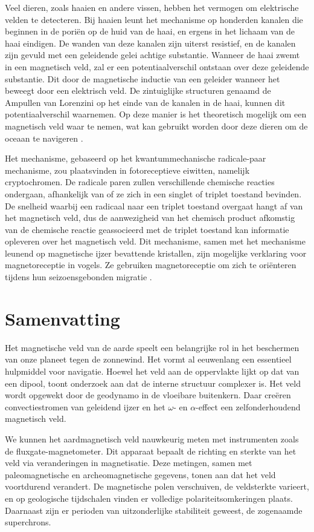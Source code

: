 \documentclass[12pt,a4paper]{article}
\begin{document}
Veel dieren, zoals haaien en andere vissen, hebben het vermogen om elektrische velden te detecteren.
Bij haaien leunt het mechanisme op honderden kanalen die beginnen in de poriën op de huid van de haai, en ergens in het lichaam van de haai eindigen.
De wanden van deze kanalen zijn uiterst resistief, en de kanalen zijn gevuld met een geleidende gelei achtige substantie. Wanneer de haai zwemt in een magnetisch veld, zal er een potentiaalverschil ontstaan over deze geleidende substantie.
Dit door de magnetische inductie van een geleider wanneer het beweegt door een elektrisch veld. De zintuiglijke structuren genaamd de Ampullen van Lorenzini op het einde van de kanalen in de haai, kunnen dit potentiaalverschil waarnemen.
Op deze manier is het theoretisch mogelijk om een magnetisch veld waar te nemen, wat kan gebruikt worden door deze dieren om de oceaan te navigeren
\cite{ijmert_physics_today}. 

Het mechanisme, gebaseerd op het kwantummechanische radicale-paar mechanisme, zou plaatsvinden in fotoreceptieve eiwitten, namelijk cryptochromen.
De radicale paren zullen verschillende chemische reacties ondergaan, afhankelijk van of ze zich in een singlet of triplet toestand bevinden.
De snelheid waarbij een radicaal naar een triplet toestand overgaat hangt af van het magnetisch veld, dus de aanwezigheid van het chemisch product afkomstig van de chemische reactie geassocieerd met de triplet toestand kan informatie opleveren over het magnetisch veld.
Dit mechanisme, samen met het mechanisme leunend op magnetische ijzer bevattende kristallen, zijn mogelijke verklaring voor magnetoreceptie in vogels.
Ze gebruiken magnetoreceptie om zich te oriënteren tijdens hun seizoensgebonden migratie 
\cite{ijmert_physics_today, ijmert_royal_society}.
\section{Samenvatting}

Het magnetische veld van de aarde speelt een belangrijke rol in het beschermen van onze planeet tegen de zonnewind. Het vormt al eeuwenlang een essentieel hulpmiddel voor navigatie. Hoewel het veld aan de oppervlakte lijkt op dat van een dipool, toont onderzoek aan dat de interne structuur complexer is. Het veld wordt opgewekt door de geodynamo in de vloeibare buitenkern. Daar creëren convectiestromen van geleidend ijzer en het $\omega$- en $\alpha$-effect een zelfonderhoudend magnetisch veld.

We kunnen het aardmagnetisch veld nauwkeurig meten met instrumenten zoals de fluxgate-magnetometer. Dit apparaat bepaalt de richting en sterkte van het veld via veranderingen in magnetisatie. Deze metingen, samen met paleomagnetische en archeomagnetische gegevens, tonen aan dat het veld voortdurend verandert. De magnetische polen verschuiven, de veldsterkte varieert, en op geologische tijdschalen vinden er volledige polariteitsomkeringen plaats. Daarnaast zijn er perioden van uitzonderlijke stabiliteit geweest, de zogenaamde superchrons.
\end{document}
